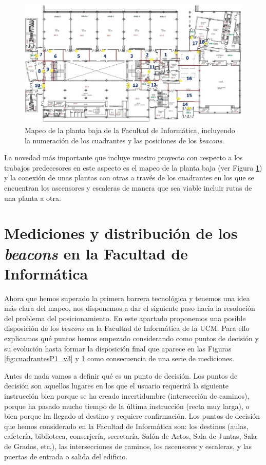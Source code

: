 \begin{figure}[t]
	\centering
	\includegraphics[width=1\textwidth]{Imagenes/Descripciondeltrabajo/mapeoPlantaBaja}
	\caption{Mapeo de la planta baja de la Facultad de Informática, incluyendo la numeración de los cuadrantes y las posiciones de los \textit{beacons}.}
	\label{fig:cuadrantesPbaja}
\end{figure}

La novedad más importante que incluye nuestro proyecto con respecto a los trabajos predecesores en este aspecto es el mapeo de la planta baja (ver Figura \ref{fig:cuadrantesPbaja}) y la conexión de unas plantas con otras a través de los cuadrantes en los que se encuentran los ascensores y escaleras de manera que sea viable incluir rutas de una planta a otra.

\section{Mediciones y distribución de los \textit{beacons} en la Facultad de Informática}
\label{sec:medicionesbeacons}

Ahora que hemos superado la primera barrera tecnológica y tenemos una idea más clara del mapeo, nos disponemos a dar el siguiente paso hacia la resolución del problema del posicionamiento. En este apartado proponemos una posible disposición de los \textit{beacons} en la Facultad de Informática de la UCM. Para ello explicamos qué puntos hemos empezado considerando como puntos de decisión y su evolución hasta formar la disposición final que aparece en las Figuras \ref{fig:cuadrantesP1_v3} y \ref{fig:cuadrantesPbaja} como consecuencia de una serie de mediciones.

Antes de nada vamos a definir qué es un punto de decisión. Los puntos de decisión son aquellos lugares en los que el usuario requerirá la siguiente instrucción bien porque se ha creado incertidumbre (intersección de caminos), porque ha pasado mucho tiempo de la última instrucción (recta muy larga), o bien porque ha llegado al destino y requiere confirmación. Los puntos de decisión que hemos considerado en la Facultad de Informática son: los destinos (aulas, cafetería, biblioteca, conserjería, secretaría, Salón de Actos, Sala de Juntas, Sala de Grados, etc.), las intersecciones de caminos, los ascensores y escaleras, y las puertas de entrada o salida del edificio.

